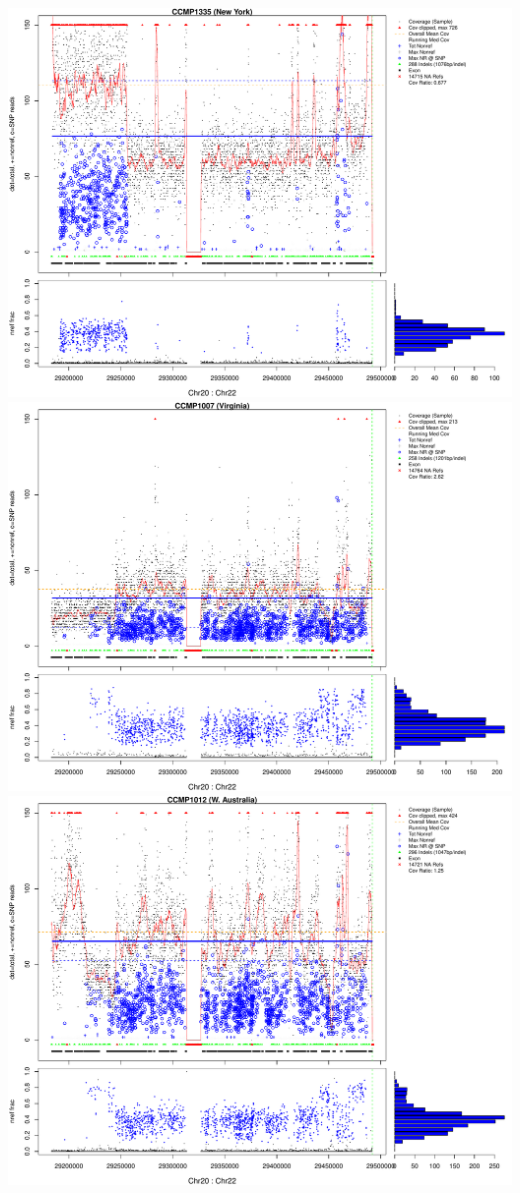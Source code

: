 \documentclass{article}\usepackage[]{graphicx}\usepackage[]{color}
\begin{document}
\includegraphics[width=\textwidth]{figs-mine/chr20x7-01.pdf}
\includegraphics[width=\textwidth]{figs-mine/chr20x7-02.pdf}
\includegraphics[width=\textwidth]{figs-mine/chr20x7-03.pdf}
\end{document}
